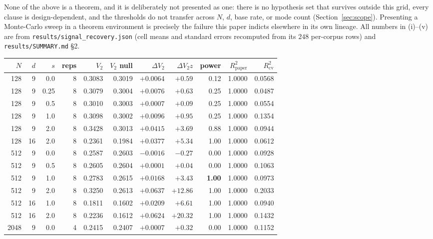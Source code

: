 \documentclass[11pt,a4paper]{article}
\theoremstyle{plain}
\theoremstyle{remark}
\theoremstyle{plain}
\begin{document}
None of the above is a theorem, and it is deliberately not presented as one: there is no hypothesis set that survives outside this grid, every clause is design-dependent, and the thresholds do not transfer across $N$, $d$, base rate, or mode count (Section~\ref{sec:scope}). Presenting a Monte-Carlo sweep in a theorem environment is precisely the failure this paper indicts elsewhere in its own lineage. All numbers in (i)--(v) are from \texttt{results/signal\_recovery.json} (cell means and standard errors recomputed from its $248$ per-corpus rows) and \texttt{results/SUMMARY.md} \S2.

\begin{table}[h]
\centering
\small
\begin{tabular}{rrrrrrrrrrr}
\toprule
$N$ & $d$ & $s$ & reps & $V_2$ & $V_2$ null & $\Delta V_2$ & $\Delta V_2z$ & power & $R^2_{\text{paper}}$ & $R^2_{\mathrm{cv}}$ \\
\midrule
128 & 9 & 0.0 & 8 & 0.3083 & 0.3019 & $+0.0064$ & $+0.59$ & 0.12 & 1.0000 & 0.0568 \\
128 & 9 & 0.25 & 8 & 0.3079 & 0.3004 & $+0.0076$ & $+0.63$ & 0.25 & 1.0000 & 0.0487 \\
128 & 9 & 0.5 & 8 & 0.3010 & 0.3003 & $+0.0007$ & $+0.09$ & 0.25 & 1.0000 & 0.0554 \\
128 & 9 & 1.0 & 8 & 0.3098 & 0.3002 & $+0.0096$ & $+0.95$ & 0.25 & 1.0000 & 0.1354 \\
128 & 9 & 2.0 & 8 & 0.3428 & 0.3013 & $+0.0415$ & $+3.69$ & 0.88 & 1.0000 & 0.0944 \\
128 & 16 & 2.0 & 8 & 0.2361 & 0.1984 & $+0.0377$ & $+5.34$ & 1.00 & 1.0000 & 0.0612 \\
512 & 9 & 0.0 & 8 & 0.2587 & 0.2603 & $-0.0016$ & $-0.27$ & 0.00 & 1.0000 & 0.0928 \\
512 & 9 & 0.5 & 8 & 0.2605 & 0.2604 & $+0.0001$ & $+0.04$ & 0.00 & 1.0000 & 0.1063 \\
512 & 9 & 1.0 & 8 & 0.2783 & 0.2615 & $+0.0168$ & $\mathbf{+3.43}$ & \textbf{1.00} & 1.0000 & 0.0973 \\
512 & 9 & 2.0 & 8 & 0.3250 & 0.2613 & $+0.0637$ & $+12.86$ & 1.00 & 1.0000 & 0.2033 \\
512 & 16 & 1.0 & 8 & 0.1811 & 0.1602 & $+0.0209$ & $+6.61$ & 1.00 & 1.0000 & 0.0940 \\
512 & 16 & 2.0 & 8 & 0.2236 & 0.1612 & $+0.0624$ & $+20.32$ & 1.00 & 1.0000 & 0.1432 \\
2048 & 9 & 0.0 & 4 & 0.2415 & 0.2407 & $+0.0007$ & $+0.32$ & 0.00 & 1.0000 & 0.1152 \\

\end{tabular}
\end{table}
\end{document}
